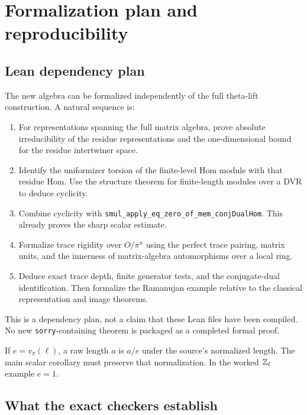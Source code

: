 \section{Formalization plan and reproducibility}
\label{sec:validation}

\subsection{Lean dependency plan}

The new algebra can be formalized independently of the full theta-lift
construction. A natural sequence is:
\begin{enumerate}
\item For representations spanning the full matrix algebra, prove
absolute irreducibility of the residue representations and the
one-dimensional bound for the residue intertwiner space.
\item Identify the uniformizer torsion of the finite-level Hom module
with that residue Hom. Use the structure theorem for finite-length
modules over a DVR to deduce cyclicity.
\item Combine cyclicity with
\texttt{smul\_apply\_eq\_zero\_of\_mem\_conjDualHom}.
This already proves the sharp scalar estimate.
\item Formalize trace rigidity over \(O/\pi^n\) using the perfect trace
pairing, matrix units, and the innerness of matrix-algebra
automorphisms over a local ring.
\item Deduce exact trace depth, finite generator tests, and the
conjugate-dual identification. Then formalize the Ramanujan example
relative to the classical representation and image theorems.
\end{enumerate}
This is a dependency plan, not a claim that these Lean files have been
compiled. No new \texttt{sorry}-containing theorem is packaged as a
completed formal proof.

If \(e=v_\pi(\ell)\), a raw length \(a\) is \(a/e\) under the source's
normalized length. The main scalar corollary must preserve that
normalization. In the worked \(\mathbb Z_\ell\) example \(e=1\).

\subsection{What the exact checkers establish}

